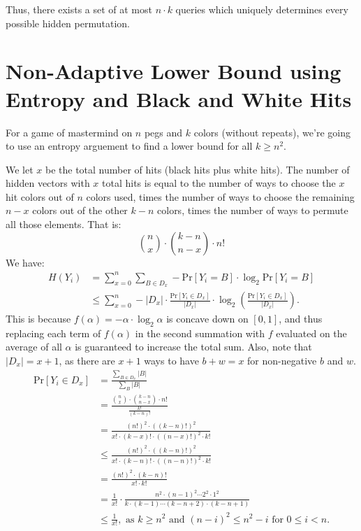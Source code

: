 \documentclass[12pt, a4paper]{article}
\begin{document}
Thus, there exists a set of at most $n\cdot k$ queries which uniquely determines every
possible hidden permutation.

\clearpage
\section*{Non-Adaptive Lower Bound using Entropy and Black and White Hits}
For a game of mastermind on $n$ pegs and $k$ colors (without repeats), we're going to
use an entropy arguement to find a lower bound for all $k\ge n^2$.

We let $x$ be the total number of hits (black hits plus white hits). The number of hidden vectors with $x$ total hits is equal to the number of ways to choose the $x$ hit colors out of $n$ colors used, times the number of ways to choose the remaining $n-x$ colors out of the other $k-n$ colors, times the number of ways to permute all those elements. That is:
    \begin{equation*}
    \binom{n}{x}\cdot\binom{k-n}{n-x}\cdot n!
	\end{equation*}
We have:
    \begin{align*}
    H(Y_i)&=\sum_{x=0}^n \sum_{B\in D_x}-\text{Pr}[Y_i=B]\cdot\log_2\text{Pr}[Y_i=B] \\
    &\leq  \sum_{x=0}^n -|D_x|\cdot \frac{\text{Pr}[Y_i\in D_x]}{|D_x|}\cdot
    \log_2 \left(\frac{\text{Pr}[Y_i\in D_x]}{|D_x|}\right).
    \end{align*}
This is because $f(\alpha) = -\alpha\cdot\log_2 \alpha$ is concave down on
$[0,1]$, and thus replacing each term of
$f(\alpha)$ in the second summation with $f$ evaluated on the average
of all $\alpha$ is guaranteed to increase the total sum. Also, note that
$|D_x|=x+1$, as there are $x+1$ ways to have $b+w=x$ for non-negative $b$ and $w$.
    \begin{align*}
    \text{Pr}[Y_i\in D_x]&=\frac{\sum_{B\in D_x} |B|}{\sum_{B} |B|}\\
    &=\frac{\binom{n}{x}\cdot\binom{k-n}{n-x}\cdot n!}{\frac{k!}{(k-n)!}}\\
    &=\frac{(n!)^2\cdot((k-n)!)^2}{x!\cdot(k-x)!\cdot((n-x)!)^2\cdot k!}\\
    &\le \frac{(n!)^2\cdot((k-n)!)^2}{x!\cdot(k-n)!\cdot((n-n)!)^2\cdot k!}\\
    &=\frac{(n!)^2\cdot(k-n)!}{x!\cdot k!}\\
    &=\frac{1}{x!}\cdot\frac{n^2\cdot(n-1)^2\cdots 2^2\cdot 1^2}{k\cdot(k-1)
    \cdots(k-n+2)\cdot(k-n+1)} \\
    &\le \frac{1}{x!}, \text{ as $k \ge n^2$ and $(n-i)^2 \le n^2-i$ for $0\le i<n$.}
    \end{align*}
\end{document}
